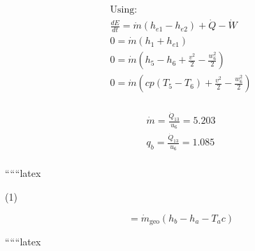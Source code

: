 \[
\begin{array}{l}
\text{Using:} \\
\frac{dE}{dt} = \dot{m} \left( h_{e1} - h_{e2} \right) + \dot{Q} - \dot{W} \\
0 = \dot{m} \left( h_1 + h_{e1} \right) \\
0 = \dot{m} \left( h_5 - h_6 + \frac{v^2}{2} - \frac{w_6^2}{2} \right) \\
0 = \dot{m} \left( cp(T_5 - T_6) + \frac{v^2}{2} - \frac{w_6^2}{2} \right) \\
\end{array}
\]

\[
\begin{array}{l}
\dot{m} = \frac{\dot{Q}_{13}}{u_6} = 5.203 \\
q_b = \frac{\dot{Q}_{13}}{u_6} = 1.085 \\
\end{array}
\]

``````latex


(1) \quad {}

\[
= \dot{m}_{\text{geo}} (h_{b} - h_{a} - T_{a} c)
\]

``````latex


